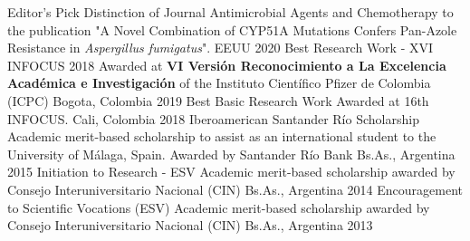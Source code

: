 


\begin{cvhonors}

  \cvhonor
    {Editor's Pick} %
    {Distinction of Journal Antimicrobial Agents and Chemotherapy to the publication "A Novel Combination of CYP51A Mutations Confers Pan-Azole Resistance in \textit{Aspergillus fumigatus}".} %
    {EEUU} %
    {2020} %
  \cvhonor
    {Best Research Work - XVI INFOCUS 2018} %
    {Awarded at \textbf{VI Versión Reconocimiento a La Excelencia Académica e Investigación} of the Instituto Científico Pfizer de Colombia (ICPC) } %
    {Bogota, Colombia} %
    {2019} %
  \cvhonor
    {Best Basic Research Work} %
    {Awarded at 16th INFOCUS.} %
    {Cali, Colombia} %
    {2018} %
  \cvhonor
    {Iberoamerican Santander Río Scholarship} %
    {Academic merit-based scholarship to assist as an international student to the University of Málaga, Spain. Awarded by Santander Río Bank} %
    {Bs.As., Argentina} %
    {2015} %
  \cvhonor
    {Initiation to Research - ESV} %
    {Academic merit-based scholarship awarded by Consejo Interuniversitario Nacional (CIN)} %
    {Bs.As., Argentina} %
    {2014} %
  \cvhonor
    {Encouragement to Scientific Vocations (ESV)} %
    {Academic merit-based scholarship awarded by Consejo Interuniversitario Nacional (CIN)} %
    {Bs.As., Argentina} %
    {2013} %


\end{cvhonors}